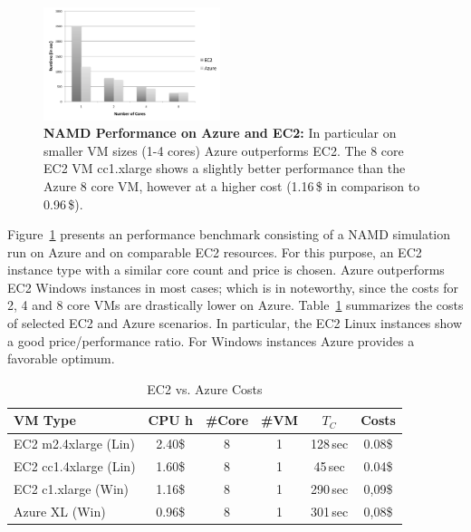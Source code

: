 \documentclass[conference,final]{IEEEtran}
\newcommand{\tc}{$T_{C}$ }
\begin{document}
\begin{figure}[htbp]
    \centering
        \includegraphics[width=0.46\textwidth]{performance/namd_ec2_azure.pdf}
    \caption{\textbf{NAMD Performance on Azure and EC2:} In particular on smaller VM sizes (1-4 cores) Azure 
    outperforms EC2. The 8 core EC2 VM cc1.xlarge shows a slightly better performance than the Azure 8 core VM,
    however at a higher cost (1.16\,\$ in comparison to 0.96\,\$).}
    \label{fig:performance_namd_ec2_azure}
\end{figure}

Figure~\ref{fig:performance_namd_ec2_azure} presents an performance 
benchmark consisting of a NAMD simulation run on Azure and on comparable 
EC2 resources. For this purpose, an EC2 instance type with a similar core
count and price is chosen. Azure outperforms EC2 Windows instances in 
most cases; which is in noteworthy, since the costs for 2, 4 and 8 core VMs are
drastically lower on Azure. Table~\ref{tbl:costs} summarizes the
costs of selected EC2 and Azure scenarios. In particular, the EC2
Linux instances show a good price/performance ratio. For Windows
instances Azure provides a favorable optimum.



\begin{table}[ht]
	\begin{footnotesize}
		\begin{tabular}{|l|c|c|c|c|c|}
	        \hline
	        VM Type                 &CPU h  &\#Core &\#VM &\tc &Costs  \\ \hline
	        EC2 m2.4xlarge (Lin)  &2.40\$  &8          &1      &128\,sec     &0.08\$ \\ \hline
	        EC2 cc1.4xlarge (Lin) &1.60\$  &8          &1      &45\,sec     &0.04\$ \\ \hline
	        EC2 c1.xlarge   (Win)   &1.16\$  &8          &1      &290\,sec    &0,09\$ \\ \hline
	        Azure XL (Win)  &0.96\$ &8          &1      &301\,sec    &0,08\$ \\ \hline
		\end{tabular}
	\end{footnotesize}
	
	\caption{EC2 vs. Azure Costs\label{tbl:costs}}
\end{table}
\end{document}
